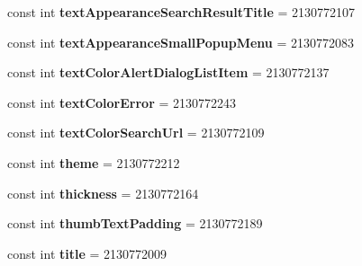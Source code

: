 \begin{DoxyCompactItemize}
\mbox{\label{classXaria_1_1Resource_1_1Attribute_a6335f21e3c7b5826c0f81d09aa27ef26}} 
const int {\bfseries text\+Appearance\+Search\+Result\+Title} = 2130772107
\item 
\mbox{\label{classXaria_1_1Resource_1_1Attribute_ad8b0af96bfae989e3a83f5692a73e560}} 
const int {\bfseries text\+Appearance\+Small\+Popup\+Menu} = 2130772083
\item 
\mbox{\label{classXaria_1_1Resource_1_1Attribute_afa6728840be85f9fcd9e349d30d2c601}} 
const int {\bfseries text\+Color\+Alert\+Dialog\+List\+Item} = 2130772137
\item 
\mbox{\label{classXaria_1_1Resource_1_1Attribute_a35a974b62b2894318883c021b59f0719}} 
const int {\bfseries text\+Color\+Error} = 2130772243
\item 
\mbox{\label{classXaria_1_1Resource_1_1Attribute_a6625c06dc7a54cedb00417ec4a785373}} 
const int {\bfseries text\+Color\+Search\+Url} = 2130772109
\item 
\mbox{\label{classXaria_1_1Resource_1_1Attribute_ab758977866a543f726350fedf04df886}} 
const int {\bfseries theme} = 2130772212
\item 
\mbox{\label{classXaria_1_1Resource_1_1Attribute_a38962a532dc839e4a783a5959f7b8c31}} 
const int {\bfseries thickness} = 2130772164
\item 
\mbox{\label{classXaria_1_1Resource_1_1Attribute_a49a5682ce3801efada2a25b7c3035329}} 
const int {\bfseries thumb\+Text\+Padding} = 2130772189
\item 
\mbox{\label{classXaria_1_1Resource_1_1Attribute_a72fa961f470baf338daea109e09e7402}} 
const int {\bfseries title} = 2130772009
\item 
\mbox{\label{classXaria_1_1Resource_1_1Attribute_a1179311062c9443b6d79c18d73ea5844}} 

\end{DoxyCompactItemize}
